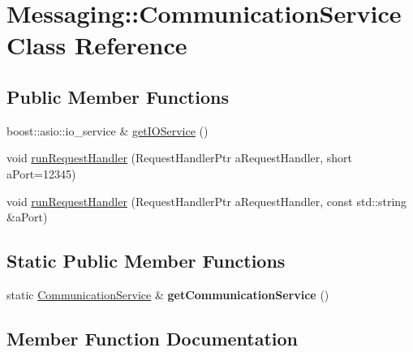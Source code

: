 \hypertarget{class_messaging_1_1_communication_service}{}\section{Messaging\+:\+:Communication\+Service Class Reference}
\label{class_messaging_1_1_communication_service}
\subsection*{Public Member Functions}
\begin{DoxyCompactItemize}
\item 
boost\+::asio\+::io\+\_\+service \& \hyperlink{class_messaging_1_1_communication_service_a603bfa697fbac1d8ea95115fbc78de24}{get\+I\+O\+Service} ()
\item 
void \hyperlink{class_messaging_1_1_communication_service_a91ea43508fc513e2be07071314bfcad9}{run\+Request\+Handler} (Request\+Handler\+Ptr a\+Request\+Handler, short a\+Port=12345)
\item 
void \hyperlink{class_messaging_1_1_communication_service_aafbba827051d66b74a0d5262074a950a}{run\+Request\+Handler} (Request\+Handler\+Ptr a\+Request\+Handler, const std\+::string \&a\+Port)
\end{DoxyCompactItemize}
\subsection*{Static Public Member Functions}
\begin{DoxyCompactItemize}
\item 
static \hyperlink{class_messaging_1_1_communication_service}{Communication\+Service} \& {\bfseries get\+Communication\+Service} ()\hypertarget{class_messaging_1_1_communication_service_a84eb6ffc757597611e01dfacb46c3702}{}\label{class_messaging_1_1_communication_service_a84eb6ffc757597611e01dfacb46c3702}

\end{DoxyCompactItemize}


\subsection{Member Function Documentation}
